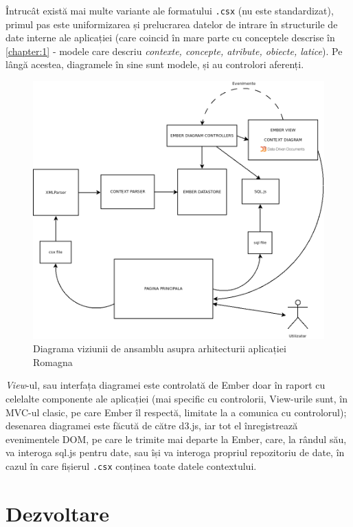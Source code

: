 \documentclass[12pt, a4paper, twoside, romanian]{teza-upb}
\begin{document}
    Întrucât există mai multe variante ale formatului \verb=.csx= (nu este standardizat), primul pas este uniformizarea și prelucrarea datelor de intrare în structurile de date interne ale aplicației (care coincid în mare parte cu conceptele descrise în \ref{chapter:1} - modele care descriu \textit{contexte, concepte, atribute, obiecte, latice}). Pe lângă acestea, diagramele în sine sunt modele, și au controlori aferenți.
    \begin{figure}[h!]
      \includegraphics[width=\textwidth, natwidth=960, natheight=848]{romagna_architecture.png}
      \caption{Diagrama viziunii de ansamblu asupra arhitecturii aplicației Romagna}
    \end{figure}
    
    \textit{View}-ul, sau interfața diagramei este controlată de Ember doar în raport cu celelalte componente ale aplicației (mai specific cu controlorii, View-urile sunt, în MVC-ul clasic, pe care Ember îl respectă, limitate la a comunica cu controlorul); desenarea diagramei este făcută de către d3.js, iar tot el înregistrează evenimentele DOM, pe care le trimite mai departe la Ember, care, la rândul său, va interoga sql.js pentru date, sau își va interoga propriul repozitoriu de date, în cazul în care fișierul \verb=.csx= conținea toate datele contextului.
    
  \section{Dezvoltare}
\end{document}
